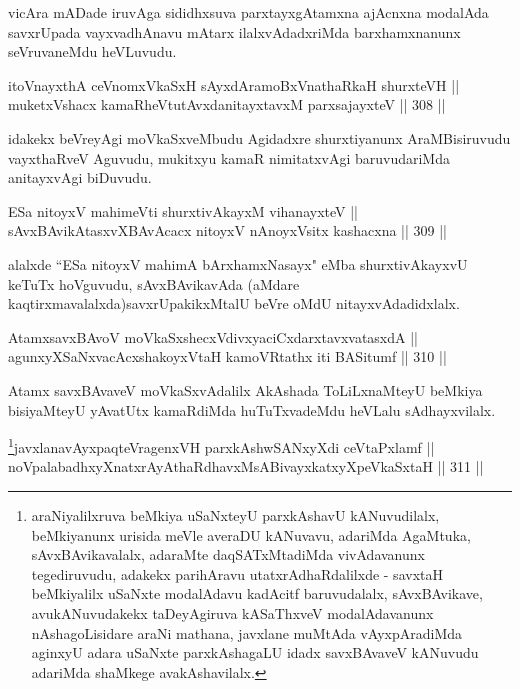 \begin{artha}
vicAra mADade iruvAga sididhxsuva parxtayxgAtamxna ajAcnxna\break
modalAda savxrUpada vayxvadhAnavu mAtarx ilalxvAdadxriMda
barxhamxnanunx seVruvaneMdu heVLuvudu.
\end{artha}


\begin{shl}
itoV\s nayxthA ceVnomxVkaSxH sAyxdAramoBxV\s nathaRkaH shurxteVH || \\
muketxVshacx kamaRheVtutAvxdanitayxtavxM parxsajayxteV \hfill || 308 || 
\end{shl}

\begin{artha}
idakekx beVreyAgi moVkaSxveMbudu Agidadxre shurxtiyanunx\break
AraMBisiruvudu vayxthaRveV Aguvudu, mukitxyu kamaR nimitatxvAgi
baruvudariMda anitayxvAgi biDuvudu.
\end{artha}

\begin{shl}
ESa nitoyxV mahimeVti shurxtivAkayxM vihanayxteV || \\
sAvxBAvikAtasxvXBAvAcacx nitoyxV nAnoyxV\s sitx kashacxna \hfill || 309 ||  
\end{shl}

\begin{artha}
alalxde ``ESa nitoyxV mahimA bArxhamxNasayx" eMba shurxtivAkayxvU keTuTx
hoVguvudu, sAvxBAvikavAda (aMdare kaqtirxmavalalxda)\break savxrUpakikxMtalU
beVre oMdU nitayxvAdadidxlalx.
\end{artha}


\begin{shl}
AtamxsavxBAvoV moVkaSxshecxVdivxyaciCxdarxtavxvatasxdA || \\
agunxyXSaNxvacAcxshakoyxV\s taH kamoVRtathx iti BASitumf \hfill || 310 ||  
\end{shl}

\begin{artha}
Atamx savxBAvaveV moVkaSxvAdalilx AkAshada ToLiLxnaMteyU beMkiya
bisiyaMteyU yAvatUtx kamaRdiMda huTuTxvadeMdu heVLalu sAdhayxvilalx.
\end{artha}



\begin{shl}
\footnote{araNiyalilxruva beMkiya uSaNxteyU parxkAshavU kANuvudilalx, beMkiyanunx urisida meVle averaDU kANuvavu, adariMda AgaMtuka, sAvxBAvikavalalx, adaraMte daqSATxMtadiMda vivAdavanunx tegediruvudu, adakekx parihAravu utatxrAdhaRdalilxde - savxtaH beMkiyalilx uSaNxte modalAdavu kadAcitf baruvudalalx, sAvxBAvikave, avukANuvudakekx taDeyAgiruva kASaThxveV modalAdavanunx nAshagoLisidare araNi mathana, javxlane muMtAda vAyxpAradiMda aginxyU adara uSaNxte parxkAshagaLU idadx savxBAvaveV kANuvudu adariMda  shaMkege avakAshavilalx.}javxlanavAyxpaqteVragenxVH parxkAshwSANxyXdi ceVtaPxlamf || \\
noVpalabadhxyXnatxrAyAthaRdhavxMsABivayxkatxyXpeVkaSxtaH \hfill || 311 ||  
\end{shl}

